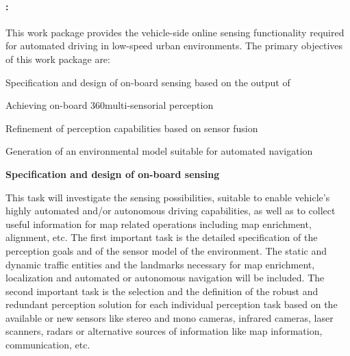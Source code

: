 
\paragraph{\WPPerception: \WPPerceptionTitle\\}
{\noindent\wptablefont
\label{wp3}

\wptableheaderB{\WPPerceptionVW}{\WPPerceptionETHZ}{\WPPerceptionIBM}{\WPPerceptionCLUJ}{\WPPerceptionPRAGUE}

This work package provides the vehicle-side online sensing functionality required for automated driving in low-speed urban environments. The primary objectives of this work package are:
\begin{denseItemize}
\item Specification and design of on-board sensing based on the output of \WPSpecification
\item Achieving on-board 360\degree \space multi-sensorial perception
\item Refinement of perception capabilities based on sensor fusion
\item Generation of an environmental model suitable for automated navigation
\end{denseItemize}

\begin{tasks}{\WPPerceptionNo}

\item  {\bf Specification and design of on-board sensing}
  \taskpartners{\CLUJ{}}{\PRAGUE{}, \VW{}}
    \label{task:wpper:spec}
  
This task will investigate the sensing possibilities, suitable to enable vehicle's highly automated and/or autonomous driving capabilities, as well as to collect useful information for map related operations including map enrichment, alignment, etc. 
The first important task is the detailed specification of the perception goals and of the sensor model of the environment. The static and dynamic traffic entities and the landmarks necessary for map enrichment, localization and automated or autonomous navigation will be included.
The second important task is the selection and the definition of the robust and redundant perception solution for each individual perception task based on the available or new sensors like stereo and mono cameras, infrared cameras, laser scanners, radars or alternative sources of information like map information, communication, etc.


\end{tasks}}

